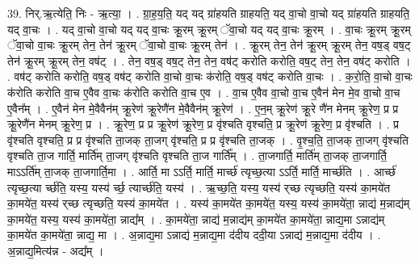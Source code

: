 \documentclass[17pt]{extarticle}
\begin{document}
39. निर्.ऋ॒त्येति॒ निः - ऋ॒त्या॒ । . ग्रा॒ह॒य॒ति॒ यद् यद् ग्रा॑हयति ग्राहयति॒ यद् वा॒चो वा॒चो यद् ग्रा॑हयति ग्राहयति॒ यद् वा॒चः । . यद् वा॒चो वा॒चो यद् यद् वा॒चः क्रू॒रम् क्रू॒रम् ॅवा॒चो यद् यद् वा॒चः क्रू॒रम् । . वा॒चः क्रू॒रम् क्रू॒रम् ॅवा॒चो वा॒चः क्रू॒रम् तेन॒ तेन॑ क्रू॒रम् ॅवा॒चो वा॒चः क्रू॒रम् तेन॑ । . क्रू॒रम् तेन॒ तेन॑ क्रू॒रम् क्रू॒रम् तेन॒ वष॒ड् वष॒ट् तेन॑ क्रू॒रम् क्रू॒रम् तेन॒ वष॑ट् । . तेन॒ वष॒ड् वष॒ट् तेन॒ तेन॒ वष॑ट् करोति करोति॒ वष॒ट् तेन॒ तेन॒ वष॑ट् करोति । . वष॑ट् करोति करोति॒ वष॒ड् वष॑ट् करोति वा॒चो वा॒चः क॑रोति॒ वष॒ड् वष॑ट् करोति वा॒चः । . क॒रो॒ति॒ वा॒चो वा॒चः क॑रोति करोति वा॒च ए॒वैव वा॒चः क॑रोति करोति वा॒च ए॒व । . वा॒च ए॒वैव वा॒चो वा॒च ए॒वैन॑ मेन मे॒व वा॒चो वा॒च ए॒वैन᳚म् । . ए॒वैन॑ मेन मे॒वैवैन॑म् क्रू॒रेण॑ क्रू॒रेणै॑न मे॒वैवैन॑म् क्रू॒रेण॑ । . ए॒न॒म् क्रू॒रेण॑ क्रू॒रे णै॑न मेनम् क्रू॒रेण॒ प्र प्र क्रू॒रेणै॑न मेनम् क्रू॒रेण॒ प्र । . क्रू॒रेण॒ प्र प्र क्रू॒रेण॑ क्रू॒रेण॒ प्र वृ॑श्चति वृश्चति॒ प्र क्रू॒रेण॑ क्रू॒रेण॒ प्र वृ॑श्चति । . प्र वृ॑श्चति वृश्चति॒ प्र प्र वृ॑श्चति ता॒जक् ता॒जग् वृ॑श्चति॒ प्र प्र वृ॑श्चति ता॒जक् । . वृ॒श्च॒ति॒ ता॒जक् ता॒जग् वृ॑श्चति वृश्चति ता॒ज गार्ति॒ मार्ति॑म् ता॒जग् वृ॑श्चति वृश्चति ता॒ज गार्ति᳚म् । . ता॒जगार्ति॒ मार्ति॑म् ता॒जक् ता॒जगार्ति॒ माऽऽर्ति॑म् ता॒जक् ता॒जगार्ति॒मा । . आर्ति॒ मा ऽऽर्ति॒ मार्ति॒ मार्च्छ॑ त्यृच्छ॒त्या ऽऽर्ति॒ मार्ति॒ मार्च्छ॑ति । . आर्च्छ॑ त्यृच्छ॒त्या र्च्छ॑ति॒ यस्य॒ यस्य॑ र्च्छ॒ त्यार्च्छ॑ति॒ यस्य॑ । . ऋ॒च्छ॒ति॒ यस्य॒ यस्य॑ र्‌च्छ त्यृच्छति॒ यस्य॑ का॒मये॑त का॒मये॑त॒ यस्य॑ र्‌च्छ त्यृच्छति॒ यस्य॑ का॒मये॑त । . यस्य॑ का॒मये॑त का॒मये॑त॒ यस्य॒ यस्य॑ का॒मये॑ता॒ न्नाद्य॑ म॒न्नाद्य॑म् का॒मये॑त॒ यस्य॒ यस्य॑ का॒मये॑ता॒ न्नाद्य᳚म् । . का॒मये॑ता॒ न्नाद्य॑ म॒न्नाद्य॑म् का॒मये॑त का॒मये॑ता॒ न्नाद्य॒मा ऽन्नाद्य॑म् का॒मये॑त का॒मये॑ता॒ न्नाद्य॒ मा । . अ॒न्नाद्य॒मा ऽन्नाद्य॑ म॒न्नाद्य॒मा द॑दीय ददी॒या ऽन्नाद्य॑ म॒न्नाद्य॒मा द॑दीय । . अ॒न्नाद्य॒मित्य॑न्न - अद्य᳚म् । \newline
\pagebreak
{}
\end{document}
